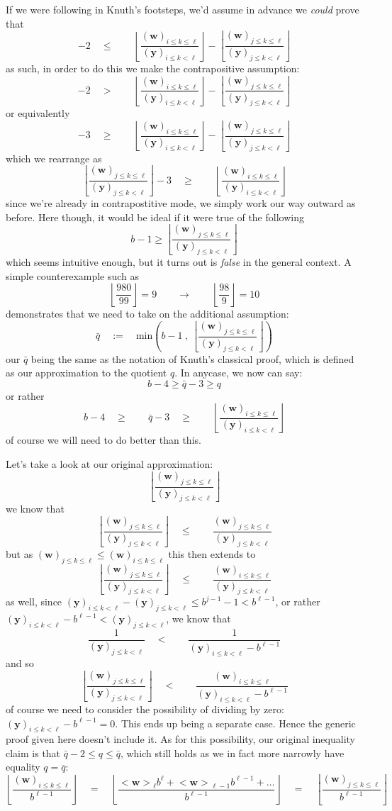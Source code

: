 \documentclass[twoside]{article}
\renewcommand{\leq}{\ensuremath{\quad\le\qquad}}
\renewcommand{\geq}{\ensuremath{\quad\ge\qquad}}
\newcommand{\bseq}[1][u]{\ensuremath{<\!\!\bm{#1}\!\!>}}
\newcommand{\numer}[3][w]{\ensuremath{(\bm{#1})_{#2\le k\le #3}}}
\newcommand{\denom}[3][y]{\ensuremath{(\bm{#1})_{#2\le k <  #3}}}
\begin{document}
If we were following in Knuth's footsteps, we'd assume in advance we \emph{could} prove that 
$$ -2\leq\left\lfloor\frac{\numer{i}{\ell}}{\denom{i}{\ell}}\right\rfloor
		-\left\lfloor\frac{\numer{j}{\ell}}{\denom{j}{\ell}}\right\rfloor $$
as such, in order to do this we make the contrapositive assumption:
$$ -2\quad >\qquad\left\lfloor\frac{\numer{i}{\ell}}{\denom{i}{\ell}}\right\rfloor
		-\left\lfloor\frac{\numer{j}{\ell}}{\denom{j}{\ell}}\right\rfloor $$
or equivalently
$$ -3\geq\left\lfloor\frac{\numer{i}{\ell}}{\denom{i}{\ell}}\right\rfloor
		-\left\lfloor\frac{\numer{j}{\ell}}{\denom{j}{\ell}}\right\rfloor $$
which we rearrange as
$$ \left\lfloor\frac{\numer{j}{\ell}}{\denom{j}{\ell}}\right\rfloor-3
	\geq\left\lfloor\frac{\numer{i}{\ell}}{\denom{i}{\ell}}\right\rfloor $$
since we're already in contrapostitive mode, we simply work our way outward as before. Here though, it would be ideal if it
were true of the following 
$$ b-1\ge\left\lfloor\frac{\numer{j}{\ell}}{\denom{j}{\ell}}\right\rfloor $$
which seems intuitive enough, but it turns out is \emph{false} in the general context. A simple counterexample such as
$$ \left\lfloor\frac{980}{99}\right\rfloor=9
	\qquad\to\qquad\left\lfloor\frac{98}{9}\right\rfloor=10 $$
demonstrates that we need to take on the additional assumption:
$$ \bar{q}\quad:=\quad\mbox{min}\left(b-1\ ,\ \left\lfloor\frac{\numer{j}{\ell}}{\denom{j}{\ell}}\right\rfloor\right) $$
our $ \bar{q} $ being the same as the notation of Knuth's classical proof, which is defined as our approximation to the
quotient $ q $.  In anycase, we now can say:
$$ b-4\ge\bar{q}-3\ge q $$
or rather
$$ b-4\geq\bar{q}-3
	\geq\left\lfloor\frac{\numer{i}{\ell}}{\denom{i}{\ell}}\right\rfloor $$
of course we will need to do better than this.

Let's take a look at our original approximation:
$$ \left\lfloor\frac{\numer{j}{\ell}}{\denom{j}{\ell}}\right\rfloor $$
we know that
$$ \left\lfloor\frac{\numer{j}{\ell}}{\denom{j}{\ell}}\right\rfloor
	\leq\frac{\numer{j}{\ell}}{\denom{j}{\ell}} $$
but as $ \numer{j}{\ell}\le\numer{i}{\ell} $ this then extends to
$$ \left\lfloor\frac{\numer{j}{\ell}}{\denom{j}{\ell}}\right\rfloor
	\leq\frac{\numer{i}{\ell}}{\denom{j}{\ell}} $$
as well, since $ \denom{i}{\ell}-\denom{j}{\ell}\le b^{j-1}-1 < b^{\ell-1}$,
or rather $ \denom{i}{\ell}-b^{\ell-1} < \denom{j}{\ell} $, we know that
$$ \frac{1}{\denom{j}{\ell}}\quad <\qquad\frac{1}{\denom{i}{\ell}-b^{\ell-1}} $$
and so
$$ \left\lfloor\frac{\numer{j}{\ell}}{\denom{j}{\ell}}\right\rfloor
	\quad <\qquad\frac{\numer{i}{\ell}}{\denom{i}{\ell}-b^{\ell-1}} $$
of course we need to consider the possibility of dividing by zero: $ \denom{i}{\ell}-b^{\ell-1}=0 $. This ends up being
a separate case. Hence the generic proof given here doesn't include it. As for this possibility, our original inequality
claim is that $ \bar{q}-2\le q\le\bar{q} $, which still holds as we in fact more narrowly have equality $ q=\bar{q} $:
$$ \left\lfloor\frac{\numer{i}{\ell}}{b^{\ell-1}}\right\rfloor
	\quad =\quad\left\lfloor\frac{\bseq[w]_{\ell}b^\ell+\bseq[w]_{\ell-1}b^{\ell-1}+\ldots}{b^{\ell-1}}\right\rfloor
	\quad =\quad\left\lfloor\frac{\numer{j}{\ell}}{b^{\ell-1}}\right\rfloor $$
\end{document}
